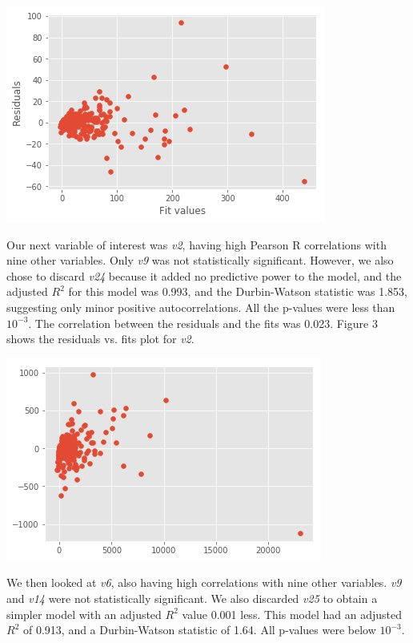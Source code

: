 \documentclass[12pt,a4paper,twocolumn]{article}
\begin{document}
	\includegraphics[scale=0.5]{fig2.png}
	\begingroup
	\endgroup
	\hfill\break
	
	Our next variable of interest was \textit{v2}, having high Pearson R correlations with nine other variables. Only \textit{v9} was not statistically significant. However, we also chose to discard \textit{v24} because it added no predictive power to the model, and the adjusted $R^2$ for this model was 0.993, and the Durbin-Watson statistic was 1.853, suggesting only minor positive autocorrelations. All the p-values were less than $10^{-3}$. The correlation between the residuals and the fits was 0.023. Figure 3 shows the residuals vs. fits plot for \textit{v2}.
	
	\includegraphics[scale=0.5]{fig3.png}
	\begingroup
	\endgroup
	\hfill\break
	
	We then looked at \textit{v6}, also having high correlations with nine other variables. \textit{v9} and \textit{v14} were not statistically significant. We also discarded \textit{v25} to obtain a simpler model with an adjusted $R^2$ value 0.001 less. This model had an adjusted $R^2$ of 0.913, and a Durbin-Watson statistic of 1.64. All p-values were below $10^{-3}$.
	
\end{document}
